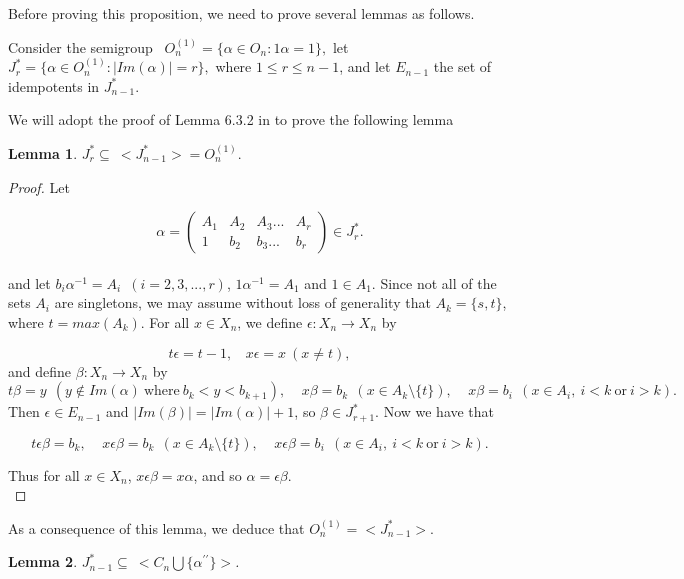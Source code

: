 \documentclass[10pt]{extarticle}
\numberwithin{equation}{section}
\numberwithin{bbb}{section}
\newtheorem{lemma}{Lemma}[section]
\numberwithin{equation}{section}
\begin{document}
\vspace{0.8cm}
Before proving this proposition, we need to prove several lemmas as follows.

\vspace{0.8cm}
Consider the semigroup \
$O_{n}^{(1)}=\{\alpha \in O_n : 1\alpha=1\},$
let
$J^*_{r}=\{\alpha \in O_{n}^{(1)} : |Im(\alpha)|=r\},$
where $1 \leq r \leq n-1$, and let $E_{n-1}$ the set of idempotents in $J^*_{n-1}$.

\vspace{0.8cm}
We will adopt the proof of Lemma 6.3.2 in \cite{6} to prove the following lemma
\vspace{0.1cm}
\begin{lemma}
 $J^*_{r}\subseteq \ <J^*_{n-1}>=O_{n}^{(1)}.$ 
\end{lemma}

\begin{proof}
Let

$$\alpha=
\begin{pmatrix}  A_1&A_2&A_3...&A_r\\1&b_2&b_3...&b_r
\end{pmatrix}
\in J^*_r.$$\\[5pt]
and let $b_i\alpha^{-1}=A_i \,\,\, (i=2,3,...,r)$, $ 1\alpha^{-1}=A_1$ and $1\in A_1$. Since not all of the sets $A_i$ are singletons, we may assume without loss of generality that $A_k=\{s,t\}$, where $t=max(A_k)$. For all $x\in X_n$, we define $\epsilon: X_n \rightarrow X_n$ by

$$t\epsilon=t-1, \ \ \ \ x\epsilon=x \ (x \neq t),$$ 
and define $\beta: X_n \rightarrow X_n$ by
$$t\beta=y \ \ (y \notin Im(\alpha) \ \text{where} \ b_k<y<b_{k+1}), \ \ \ \ \ x\beta=b_k \ \ (x \in A_k\setminus \{t\}), \ \ \ \ \ x\beta=b_i \ \ (x \in A_i, \ i<k \ \text{or} \ i>k).$$
Then $\epsilon \in E_{n-1}$ and $|Im(\beta)|=|Im(\alpha)|+1$, so $\beta \in J^*_{r+1}$. Now we have that

 $$t\epsilon\beta=b_k, \ \ \ \ \ x\epsilon\beta=b_k \ \ (x \in A_k\setminus \{t\}), \ \ \ \ \ x\epsilon\beta=b_i \ \ (x \in A_i, \ i<k \ \text{or} \ i>k).$$

Thus for all $x\in X_n$, $x\epsilon\beta=x\alpha$, and so $\alpha=\epsilon\beta$.\\
\end{proof}

As a consequence of this lemma, we deduce that $O^{(1)}_n=<J^*_{n-1}>$.

\begin{lemma}
  $J^*_{n-1}\subseteq \ <C_n \bigcup \{\alpha^{\prime\prime}\}>$.
\end{lemma}
\end{document}
